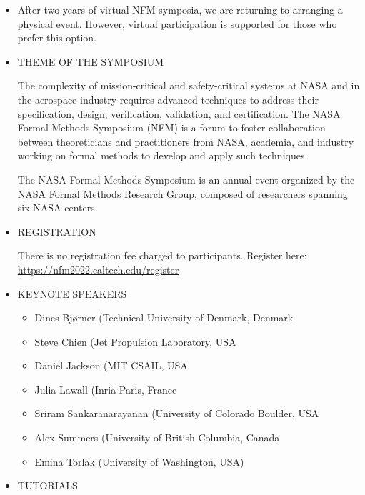 \documentclass[prodmode,acmtecs]{acmsmall} %
\begin{document}
\begin{itemize}\item  After two years of virtual NFM symposia, we are returning to arranging a physical event. However, virtual participation is supported for those who prefer this option. 
 
\item  THEME OF THE SYMPOSIUM 
 
  The complexity of mission-critical and safety-critical systems at NASA and in the aerospace industry requires advanced techniques to address their specification, design, verification, validation, and certification. The NASA Formal Methods Symposium (NFM) is a forum to foster collaboration between theoreticians and practitioners from NASA, academia, and industry working on formal methods to develop and apply such techniques.  
 
  The NASA Formal Methods Symposium is an annual event organized by the NASA Formal Methods Research Group, composed of researchers spanning six NASA centers.  
 
\item  REGISTRATION 
 
  There is no registration fee charged to participants. Register here: \href{https://nfm2022.caltech.edu/register}{https://nfm2022.caltech.edu/register}  
 
\item  KEYNOTE SPEAKERS 
 
\begin{itemize}\item  Dines Bjørner (Technical University of Denmark, Denmark
\item  Steve Chien (Jet Propulsion Laboratory, USA
\item  Daniel Jackson (MIT CSAIL, USA
\item  Julia Lawall (Inria-Paris, France
\item  Sriram Sankaranarayanan (University of Colorado Boulder, USA
\item  Alex Summers (University of British Columbia, Canada
\item  Emina Torlak (University of Washington, USA)
\end{itemize} 
\item  TUTORIALS 
 

\end{itemize}
\end{document}

